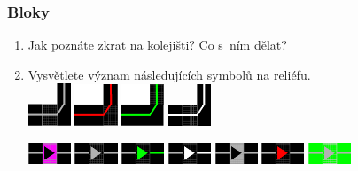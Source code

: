 \documentclass[12pt,a4paper]{article}
\begin{document}
\subsubsection*{Bloky}
\begin{enumerate}[leftmargin=*]
\item Jak poznáte zkrat na kolejišti? Co s~ním dělat?
\item Vysvětlete význam následujících symbolů na reliéfu. \\
\includegraphics[width=0.1\textwidth]{symboly/kol1.png}
\includegraphics[width=0.1\textwidth]{symboly/kol2.png}
\includegraphics[width=0.1\textwidth]{symboly/kol3.png}
\includegraphics[width=0.1\textwidth]{symboly/kol4.png}

\includegraphics[width=0.1\textwidth]{symboly/hlnav16.png}
\includegraphics[width=0.1\textwidth]{symboly/hlnav1.png}
\includegraphics[width=0.1\textwidth]{symboly/hlnav2.png}
\includegraphics[width=0.1\textwidth]{symboly/hlnav3.png}
\includegraphics[width=0.1\textwidth]{symboly/hlnav5.png}
\includegraphics[width=0.1\textwidth]{symboly/hlnav6.png}
\includegraphics[width=0.1\textwidth]{symboly/hlnav8.png}


\end{enumerate}
\end{document}
